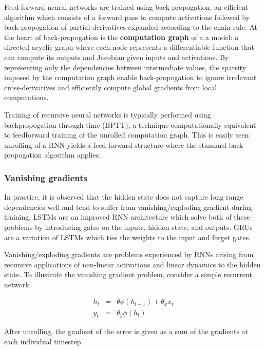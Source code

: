 Feed-forward neural networks are trained using back-propogation, an efficient
algorithm which consists of a forward pass to compute activations followed by
back-propogation of partial derivatives expanded according to the chain
rule. At the heart of back-propogation is the
\textbf{computation graph} of a a model: a directed acyclic graph where each
node represents a differentiable function that can compute its outputs and
Jacobian given inputs and activations. By representing only
the dependencies between intermediate values, the sparsity imposed by the
computation graph enable back-propogation to ignore irrelevant
cross-derivatives and efficiently compute global gradients from local
computations.


Training of recursive neural networks is typically performed using
backpropogation through time (BPTT)\cite{at}, a technique computationally
equivalent to feedforward training of the unrolled computation graph. This is
easily seen: unrolling of a RNN yields a feed-forward structure where the
standard back-propogation algorithm applies.




\subsubsection{Vanishing gradients}

In practice, it is observed that the hidden state does not capture long range
dependencies well and tend to suffer from vanishing/exploding gradient during
training. LSTMs are an improved RNN architecture which solve both of these
problems by introducing gates on the inputs, hidden state, and outputs. GRUs are
a variation of LSTMs which ties the weights to the input and forget gates.

Vanishing/exploding gradients \cite{Bengio1994} are problems experienced by
RNNs arising from recursive applications of non-linear activations and linear dynamics
to the hidden state. To illustrate the vanishing gradient problem, consider
a simple recurrent network

\begin{eqnarray}
    h_t &=& \theta \phi(h_{t-1}) + \theta_x x_t \label{eq:ht-from-ht-1}\\
    y_t &=& \theta_y \phi(h_t)
\end{eqnarray}

After unrolling, the gradient of the error is given as a sum of the gradients
at each individual timestep

